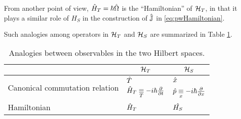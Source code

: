 From another point of view, $\op{H}_{T} = \hbar\op{\Omega}$ is the ``Hamiltonian'' of $\hilb{H}_T$,
in that it plays a similar role of $H_S$ in the construction of
$\op{\mathbb{J}}$ in \eqref{eq:pwHamiltonian}.

Such analogies among operators in $\hilb{H}_T$ and $\hilb{H}_S$ are summarized in Table \ref{tbl:op_comparison_pw}.

{
  \begin{table}
    \centering
    \begin{tabular}{l|l|l}
      & \multicolumn{1}{c|}{$\hilb{H}_T$}                 & \multicolumn{1}{|c}{$\hilb{H}_S$}       \\
      \hline
      \multirow{2}{11em}{Canonical commutation relation}
      & $\op{T}$                                          & $\op{x}$                            \\
      & $\op{H}_T \repr[T] -i\hbar\pdv{t} $  & $\op{p} \repr[x] -i\hbar\pdv{x}$       \\
      \hline
      Hamiltonian
      & $\op{H}_T$                                        & $\op{H_S}$
    \end{tabular}
    {\caption{
      Analogies between observables in the two Hilbert spaces.
    }\label{tbl:op_comparison_pw}}
  \end{table}
}


